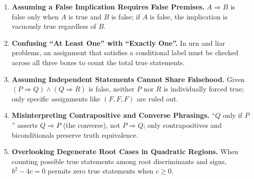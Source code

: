\documentclass[11pt,a4paper]{article}
\begin{document}
\begin{enumerate}[leftmargin=2em, itemsep=4pt]
  \item \textbf{Assuming a False Implication Requires False Premises.}
        $A \Rightarrow B$ is false only when $A$ is true and $B$ is false; if $A$ is false, the implication is vacuously true regardless of $B$. 
  \item \textbf{Confusing ``At Least One'' with ``Exactly One''.}
        In urn and liar problems, an assignment that satisfies a conditional label must be checked across all three boxes to count the total true statements. 
  \item \textbf{Assuming Independent Statements Cannot Share Falsehood.}
        Given $(P \Rightarrow Q) \land (Q \Rightarrow R)$ is false, neither $P$ nor $R$ is individually forced true; only specific assignments like $(F, F, F)$ are ruled out. 
  \item \textbf{Misinterpreting Contrapositive and Converse Phrasings.}
        ``$Q$ only if $P$'' asserts $Q \Rightarrow P$ (the converse), not $P \Rightarrow Q$; only contrapositives and biconditionals preserve truth equivalence. 
  \item \textbf{Overlooking Degenerate Root Cases in Quadratic Regions.}
        When counting possible true statements among root discriminants and signs, $b^2-4c=0$ permits zero true statements when $c \ge 0$. 
\end{enumerate}

\end{document}
